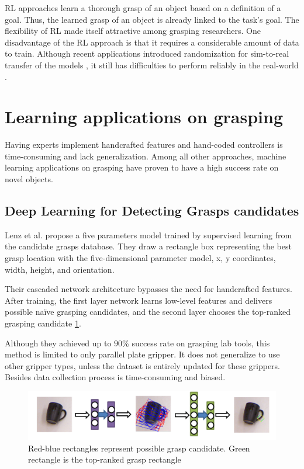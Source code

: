 RL approaches learn a thorough grasp of an object based on a definition of a goal. Thus, the learned grasp of an object is already linked to the task's goal. The flexibility of RL made itself attractive among grasping researchers. One disadvantage of the RL approach is that it requires a considerable amount of data to train. Although recent applications introduced randomization for sim-to-real transfer of the models \cite{Andrychowicz2020}, it still has difficulties to perform reliably in the real-world \cite{Caldera2018}.

\section{Learning applications on grasping}

Having experts implement handcrafted features and hand-coded controllers is time-consuming and lack generalization. Among all other approaches, machine learning applications on grasping have proven to have a high success rate on novel objects.


\subsection{Deep Learning for Detecting Grasps candidates}
Lenz et al. propose a five parameters model trained by supervised learning from the candidate grasps database. They draw a rectangle box representing the best grasp location with the five-dimensional parameter model, x, y coordinates, width, height, and orientation.

Their cascaded network architecture bypasses the need for handcrafted features. After training, the first layer network learns low-level features and delivers possible naïve grasping candidates, and the second layer chooses the top-ranked grasping candidate \ref{fig:deeplearngrasp}.

Although they achieved up to \(90\%\) success rate on grasping lab tools, this method is limited to only parallel plate gripper. It does not generalize to use other gripper types, unless the dataset is entirely updated for these grippers. Besides data collection process is time-consuming and biased.

\begin{figure}[htbp]
    \centering
    \includegraphics[width=1.\textwidth]{figures/DeepLearningGrasp}
    \caption{Red-blue rectangles represent possible grasp candidate. Green rectangle is the top-ranked grasp rectangle \cite{Lenz2013}}
    \label{fig:deeplearngrasp}
\end{figure}

